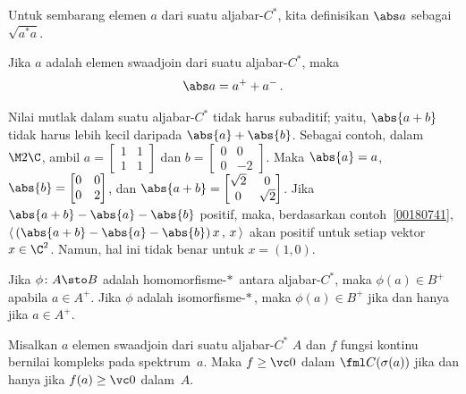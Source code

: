 \begin{defn} Untuk sembarang elemen $a$ dari suatu aljabar-$C^*$, kita definisikan
$\abs a$ sebagai $\sqrt{a^*a}$.
\end{defn}

\begin{prop} Jika $a$ adalah elemen swaadjoin dari suatu aljabar-$C^*$, maka
  \[ \abs a = a^+ + a^-\,. \]
\end{prop}

\begin{exam} Nilai mutlak dalam suatu aljabar-$C^*$ tidak harus
subaditif; yaitu, $\abs{a + b}$ tidak harus lebih kecil daripada $\abs{a}
+ \abs{b}$. Sebagai contoh, dalam $\M 2\C$, ambil $a = \begin{bmatrix} 1 & 1 \\
1 & 1 \end{bmatrix}$ dan $b = \begin{bmatrix} 0 & 0 \\ 0 & -2
\end{bmatrix}$. Maka $\abs{a} = a$, $\abs{b} = \begin{bmatrix} 0 &
0 \\ 0 & 2 \end{bmatrix}$, dan $\abs{a + b} = \begin{bmatrix} \sqrt{2} & 0 \\ 0 &
\sqrt{2}
\end{bmatrix}$. Jika $\abs{a + b} - \abs{a} - \abs{b}$ positif, maka, berdasarkan
contoh~\ref{00180741}, $\langle\,(\abs{a + b} - \abs{a} - \abs{b})\,x\,,\,x\,\rangle$
akan positif untuk setiap vektor $x \in \C^2$. Namun, hal ini tidak benar untuk $x = (1,0)$.
\end{exam}

\begin{prop}\label{0018201} Jika $\phi\colon A \sto B$ adalah homomorfisme-$*\,$ antara
aljabar-$C^*$, maka $\phi(a) \in B^+$ apabila $a \in A^+$. Jika $\phi$ adalah
isomorfisme-$*\,$, maka $\phi(a) \in B^+$ jika dan hanya jika $a \in A^+$.
\end{prop}

\begin{prop} Misalkan $a$ elemen swaadjoin dari suatu aljabar-$C^*$ $A$ dan $f$ fungsi kontinu
bernilai kompleks pada spektrum~$a$. Maka $f \ge \vc 0$ dalam $\fml
C(\sigma(a))$ jika dan hanya jika $f(a) \ge \vc 0$ dalam~$A$.
\end{prop}


